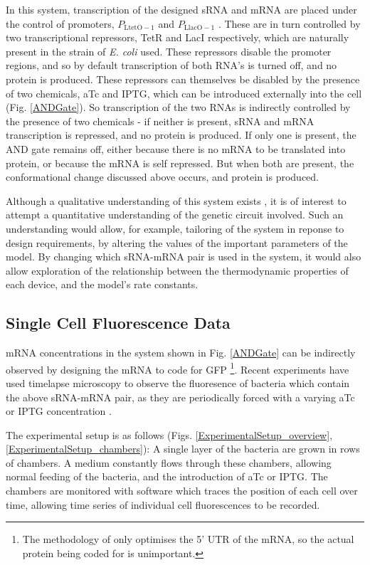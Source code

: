 \documentclass[10pt,journal]{./IEEE_latex_class/IEEEtran}
\begin{document}
In this system, transcription of the designed sRNA and mRNA are placed under the control of promoters, $P_{\mathrm{LtetO-1}}$ and $P_\mathrm{LlacO-1}$ \cite{Lutz1997}. These are in turn controlled by two transcriptional repressors, TetR and LacI respectively, which are naturally present in the strain of \textit{E. coli} used. These repressors disable the promoter regions, and so by default transcription of both RNA's is turned off, and no protein is produced. 
These repressors can themselves be disabled by the presence of two chemicals, aTc and IPTG, which can be introduced externally into the cell (Fig. \ref{ANDGate}).  So transcription of the two RNAs is indirectly controlled by the presence of two chemicals - if neither is present, sRNA and mRNA transcription is repressed, and no protein is produced. If only one is present, the AND gate remains off, either because there is no mRNA to be translated into protein, or because the mRNA is self repressed. But when both are present, the conformational change discussed above occurs, and protein is produced.

Although a qualitative understanding of this system exists \cite{Rodrigo2012}, it is of interest to attempt a quantitative understanding of the genetic circuit involved. Such an understanding would allow, for example, tailoring of the system in reponse to design requirements, by altering the values of the important parameters of the model. By changing which sRNA-mRNA pair is used in the system, it would also allow exploration of the relationship between the thermodynamic properties of each device, and the model's rate constants.
 
\subsection{Single Cell Fluorescence Data}

mRNA concentrations in the system shown in Fig. \ref{ANDGate} can be indirectly observed by designing the mRNA to code for GFP \footnote{ The methodology of \cite{Rodrigo2012} only optimises the 5' UTR of the mRNA, so the actual protein being coded for is unimportant.}. Recent experiments have used timelapse microscopy to observe the fluoresence of bacteria which contain the above sRNA-mRNA pair, as they are periodically forced with a varying aTc or IPTG concentration \cite{Jaramillo}. 

The experimental setup is as follows (Figs. \ref{ExperimentalSetup_overview},  \ref{ExperimentalSetup_chambers}): A single layer of the bacteria are grown in rows of chambers. A medium constantly flows through these chambers, allowing normal feeding of the bacteria, and the introduction of aTc or IPTG. The chambers are monitored with software which traces the position of each cell over time, allowing time series of individual cell fluorescences to be recorded.
\end{document}
